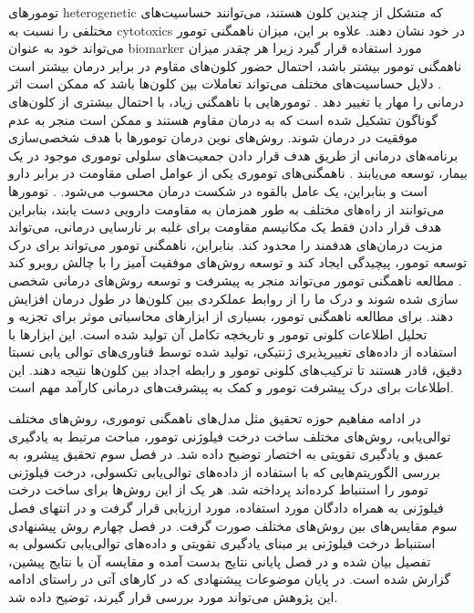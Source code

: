 تومورهای
\gls{heterogenetic}
که متشکل از چندین کلون هستند، می‌توانند حساسیت‌های مختلفی را نسبت به \glspl{cytotoxic} در خود نشان دهند. علاوه بر این، میزان ناهمگنی تومور می‌تواند خود به عنوان \gls{biomarker} مورد استفاده قرار گیرد زیرا هر چقدر میزان ناهمگنی تومور بیشتر باشد، احتمال حضور کلون‌های مقاوم در برابر درمان بیشتر است \cite{truninger2005immunohistochemical}. دلایل حساسیت‌های مختلف می‌تواند تعاملات بین کلون‌ها باشد که ممکن است اثر درمانی را مهار یا تغییر دهد \cite{birbrair2014type}. تومورهایی با ناهمگنی زیاد، با احتمال بیشتری از کلون‌های گوناگون تشکیل شده است که به درمان مقاوم هستند و ممکن است منجر به عدم موفقیت در درمان شوند. روش‌های نوین درمان تومور‌ها با هدف شخصی‌سازی برنامه‌های درمانی از طریق هدف قرار دادن جمعیت‌های سلولی توموری موجود در یک بیمار، توسعه می‌یابند \cite{fedele2014navigating}. ناهمگنی‌های توموری یکی از عوامل اصلی مقاومت در برابر دارو است و بنابراین، یک عامل بالقوه  در شکست درمان محسوب می‌شود. \cite{fedele2014navigating}. تومور‌ها می‌توانند از راه‌های مختلف به طور همزمان به مقاومت دارویی دست یابند، بنابراین هدف قرار دادن فقط یک مکانیسم مقاومت برای غلبه بر نارسایی درمانی، می‌تواند مزیت درمان‌های هدفمند را محدود کند\cite{burrell2014tumour}. بنابراین، ناهمگنی تومور می‌تواند برای درک توسعه تومور، پیچیدگی ایجاد کند و توسعه روش‌های موفقیت آمیز را با چالش روبرو کند \cite{fedele2014navigating}. مطالعه ناهمگنی تومور می‌تواند منجر به پیشرفت و توسعه روش‌های درمانی شخصی سازی شده شوند و درک ما را از روابط عملکردی بین کلون‌ها در طول درمان افزایش دهند\cite{burrell2014tumour}. برای مطالعه ناهمگنی تومور، بسیاری از ابزار‌های محاسباتی موثر برای تجزیه و تحلیل اطلاعات کلونی تومور و تاریخچه تکامل آن تولید شده است. این ابزار‌ها با استفاده از داده‌های تغییرپذیری ژنتیکی، تولید شده توسط فناوری‌های توالی یابی نسبتا دقیق، قادر هستند تا ترکیب‌های کلونی تومور و رابطه اجداد بین کلون‌ها نتیجه دهند. این اطلاعات برای درک پیشرفت تومور و کمک به پیشرفت‌های درمانی کارآمد مهم است. 


در ادامه مفاهیم حوزه تحقیق مثل مدل‌های ناهمگنی توموری، روش‌های مختلف توالی‌یابی، ‌روش‌های مختلف ساخت درخت فیلوژنی تومور، مباحث مرتبط به یادگیری عمیق و یادگیری تقویتی به اختصار توضیح داده شد. در فصل سوم تحقیق پیشرو، به بررسی الگوریتم‌هایی که با استفاده از داده‌های توالی‌یابی تکسولی، درخت فیلوژنی تومور را استنباط کرده‌اند پرداخته شد. هر یک از این روش‌ها برای ساخت درخت فیلوژنی به همراه دادگان مورد استفاده، مورد ارزیابی قرار گرفت و در انتهای فصل سوم مقایس‌های بین روش‌های مختلف صورت گرفت. در فصل چهارم روش پیشنهادی استنباط درخت فیلوژنی بر مبنای یادگیری تقویتی و داده‌های توالی‌یابی تکسولی به تفصیل بیان شده و در فصل پایانی نتایج بدست آمده و مقایسه آن با نتایج پیشین، گزارش شده است. در پایان موضوعات پیشنهادی که در کار‌های آتی در راستای ادامه این پژوهش می‌تواند مورد بررسی قرار گیرند، توضیح داده شد. 







